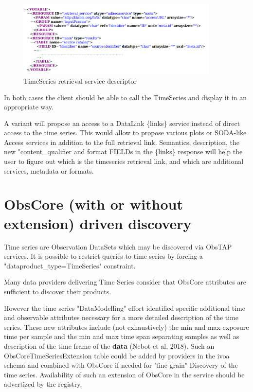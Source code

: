 \documentclass[11pt,a4paper]{ivoa}
\begin{document}
\begin{figure}
\centering

\includegraphics[width=0.9\textwidth]{ServiceDescriptor.png}
\caption{TimeSeries retrieval service descriptor}
\label{fig:ServiceDescriptor}
\end{figure}



        In both cases the client should be able to call the TimeSeries and display it in an appropriate way.

        A variant will propose an access to a  DataLink \{links\} service \citep{2015ivoa.spec.0617D} instead of direct access to the time series. This would allow to propose various plots or SODA-like Access services in addition to the full retrieval link. Semantics, description, the new "content\_qualifier  and format  FIELDs in the \{links\} response will help the user to figure out which is the timeseries retrieval link, and which are additional services, metadata or formats. 

\section{ObsCore (with or without extension) driven discovery}
\label{sec:obscore}

        Time series are Observation DataSets which may be discovered via ObsTAP services. It is possible to restrict queries to time series by forcing a "dataproduct\_type=TimeSeries" constraint.

	Many data providers delivering Time Series consider that ObsCore attributes are sufficient to discover their products.

	However the time series "DataModelling" effort identified specific additional time and observable attributes necessary for a more detailed description of the time series. These new attributes include (not exhaustively) the min and max exposure time per sample and the min and max time span separating samples as well as description of the time frame of the {\bf data} (Nebot et al, 2018). 
        Such an ObsCoreTimeSeriesExtension table could be added by providers in the ivoa schema and combined with ObsCore if needed for "fine-grain" Discovery of the time series.  
        Availability of such an extension of ObsCore in the service should be advertized by the registry.
        
\end{document}
